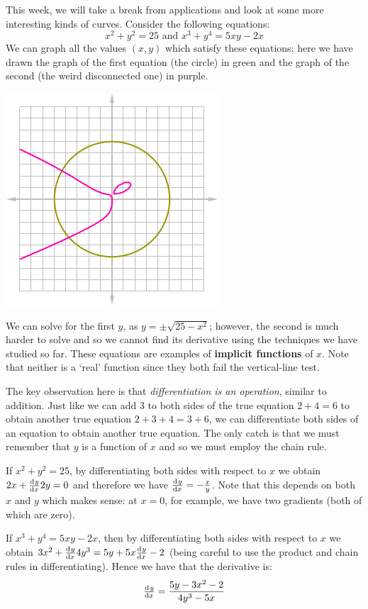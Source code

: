 


This week, we will take a break from applications and look at some more interesting kinds of curves. Consider
the following equations:
\begin{displaymath}
  x^2 + y^2 = 25 \text{ and } x^3 + y^4 = 5xy - 2x
\end{displaymath}
We can graph all the values $ (x,y) $ which satisfy these equations; here we have drawn the graph of the first
equation (the circle) in green and the graph of the second (the weird disconnected one) in purple.
\begin{center}
  \includegraphics[width=0.3\linewidth]{implicit}
\end{center}
We can solve for the first $ y $, as $ y = \pm\sqrt{25 - x^2} $; however, the second is much harder
to solve and so we cannot find its derivative using the techniques we have studied so far. These equations
are examples of \textbf{implicit functions} of $ x $. Note that neither is a `real' function since they both fail
the vertical-line test.

The key observation here is that \textit{differentiation is an operation}, similar to addition. Just like
we can add 3 to both sides of the true equation $ 2 + 4 = 6 $ to obtain another true equation $ 2 + 3 + 4 = 3 + 6 $,
we can differentiate both sides of an equation to obtain another true equation. The only catch is that we must
remember that $ y $ is a function of $ x $ and so we must employ the chain rule.

\begin{ex}
  If $ x^2 + y^2 = 25 $, by differentiating both sides with respect to $ x $ we obtain $ 2x + \od{y}{x} 2y = 0 $ and therefore
  we have $ \od{y}{x} = -\frac{x}{y} $. Note that this depends on both $ x $ and $ y $ which makes sense:
  at $ x = 0 $, for example, we have two gradients (both of which are zero).
\end{ex}

\begin{ex}
  If $ x^3 + y^4 = 5xy - 2x $, then by differentiating both sides with respect to $ x $ we
  obtain $ 3x^2 + \od{y}{x} 4y^3 = 5y + 5x \od{y}{x} - 2 $ (being careful to use the product and chain rules in differentiating). Hence
  we have that the derivative is:
  \begin{displaymath}
    \od{y}{x} = \frac{5y - 3x^2 - 2}{4y^3 - 5x}
  \end{displaymath}
\end{ex}

